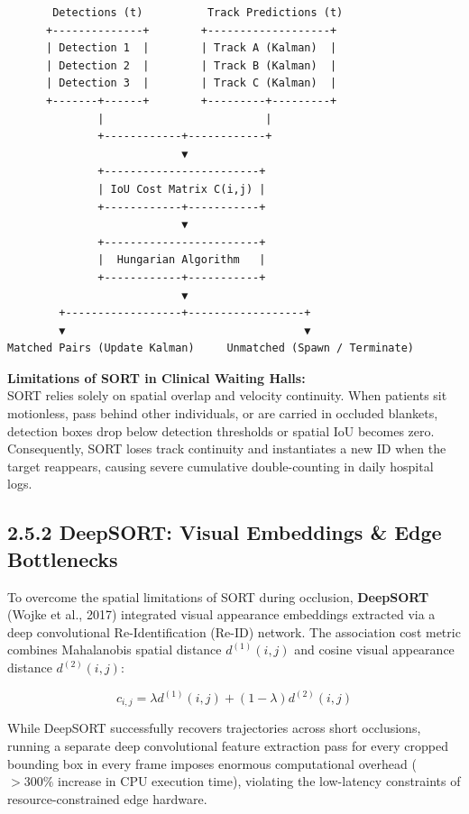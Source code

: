 \begin{verbatim}
       Detections (t)          Track Predictions (t)
      +--------------+        +-------------------+
      | Detection 1  |        | Track A (Kalman)  |
      | Detection 2  |        | Track B (Kalman)  |
      | Detection 3  |        | Track C (Kalman)  |
      +-------+------+        +---------+---------+
              |                         |
              +------------+------------+
                           ▼
              +------------------------+
              | IoU Cost Matrix C(i,j) |
              +------------+-----------+
                           ▼
              +------------------------+
              |  Hungarian Algorithm   |
              +------------+-----------+
                           ▼
        +------------------+------------------+
        ▼                                     ▼
Matched Pairs (Update Kalman)     Unmatched (Spawn / Terminate)
\end{verbatim}

\textbf{Limitations of SORT in Clinical Waiting Halls:}\\
SORT relies solely on spatial overlap and velocity continuity. When
patients sit motionless, pass behind other individuals, or are carried
in occluded blankets, detection boxes drop below detection thresholds or
spatial IoU becomes zero. Consequently, SORT loses track continuity and
instantiates a new ID when the target reappears, causing severe
cumulative double-counting in daily hospital logs.

\subsection{2.5.2 DeepSORT: Visual Embeddings \& Edge
Bottlenecks}\label{deepsort-visual-embeddings-edge-bottlenecks}

To overcome the spatial limitations of SORT during occlusion,
\textbf{DeepSORT} (Wojke et al., 2017) integrated visual appearance
embeddings extracted via a deep convolutional Re-Identification (Re-ID)
network. The association cost metric combines Mahalanobis spatial
distance \(d^{(1)}(i, j)\) and cosine visual appearance distance
\(d^{(2)}(i, j)\):

\[c_{i, j} = \lambda d^{(1)}(i, j) + (1 - \lambda) d^{(2)}(i, j)\]

While DeepSORT successfully recovers trajectories across short
occlusions, running a separate deep convolutional feature extraction
pass for every cropped bounding box in every frame imposes enormous
computational overhead (\(>300\%\) increase in CPU execution time),
violating the low-latency constraints of resource-constrained edge
hardware.


